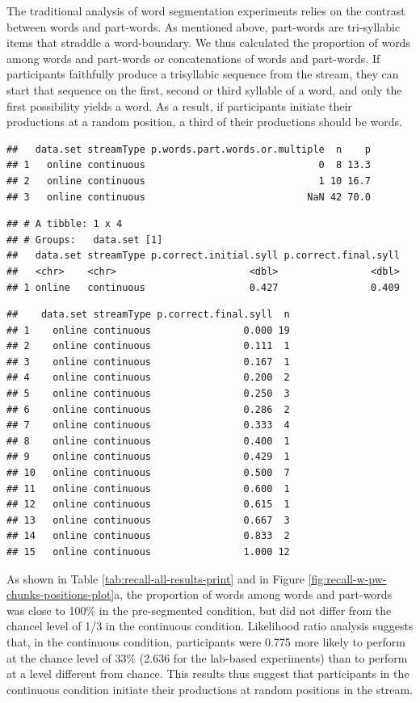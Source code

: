 \documentclass[
]{article}
\begin{document}
The traditional analysis of word segmentation experiments relies on the
contrast between words and part-words. As mentioned above, part-words
are tri-syllabic items that straddle a word-boundary. We thus calculated
the proportion of words among words and part-words or concatenations of
words and part-words. If participants faithfully produce a trisyllabic
sequence from the stream, they can start that sequence on the first,
second or third syllable of a word, and only the first possibility
yields a word. As a result, if participants initiate their productions
at a random position, a third of their productions should be words.

\begin{verbatim}
##   data.set streamType p.words.part.words.or.multiple  n    p
## 1   online continuous                              0  8 13.3
## 2   online continuous                              1 10 16.7
## 3   online continuous                            NaN 42 70.0
\end{verbatim}

\begin{verbatim}
## # A tibble: 1 x 4
## # Groups:   data.set [1]
##   data.set streamType p.correct.initial.syll p.correct.final.syll
##   <chr>    <chr>                       <dbl>                <dbl>
## 1 online   continuous                  0.427                0.409
\end{verbatim}

\begin{verbatim}
##    data.set streamType p.correct.final.syll  n
## 1    online continuous                0.000 19
## 2    online continuous                0.111  1
## 3    online continuous                0.167  1
## 4    online continuous                0.200  2
## 5    online continuous                0.250  3
## 6    online continuous                0.286  2
## 7    online continuous                0.333  4
## 8    online continuous                0.400  1
## 9    online continuous                0.429  1
## 10   online continuous                0.500  7
## 11   online continuous                0.600  1
## 12   online continuous                0.615  1
## 13   online continuous                0.667  3
## 14   online continuous                0.833  2
## 15   online continuous                1.000 12
\end{verbatim}

As shown in Table \ref{tab:recall-all-results-print} and in Figure
\ref{fig:recall-w-pw-chunks-positions-plot}a, the proportion of words
among words and part-words was close to 100\% in the pre-segmented
condition, but did not differ from the chancel level of 1/3 in the
continuous condition. Likelihood ratio analysis suggests that, in the
continuous condition, participants were 0.775 more likely to perform at
the chance level of 33\% (2.636 for the lab-based experiments) than to
perform at a level different from chance. This results thus suggest that
participants in the continuous condition initiate their productions at
random positions in the stream.
\end{document}

